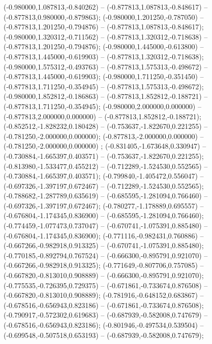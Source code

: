  (-0.980000,1.087813,-0.840262) -- (-0.877813,1.087813,-0.848617) -- (-0.877813,0.980000,-0.879863);
 (-0.980000,1.201250,-0.787050) -- (-0.877813,1.201250,-0.794876) -- (-0.877813,1.087813,-0.848617);
 (-0.980000,1.320312,-0.711562) -- (-0.877813,1.320312,-0.718638) -- (-0.877813,1.201250,-0.794876);
 (-0.980000,1.445000,-0.613800) -- (-0.877813,1.445000,-0.619903) -- (-0.877813,1.320312,-0.718638);
 (-0.980000,1.575312,-0.493763) -- (-0.877813,1.575313,-0.498672) -- (-0.877813,1.445000,-0.619903);
 (-0.980000,1.711250,-0.351450) -- (-0.877813,1.711250,-0.354945) -- (-0.877813,1.575313,-0.498672);
 (-0.980000,1.852812,-0.186863) -- (-0.877813,1.852812,-0.188721) -- (-0.877813,1.711250,-0.354945);
 (-0.980000,2.000000,0.000000) -- (-0.877813,2.000000,0.000000) -- (-0.877813,1.852812,-0.188721);
 (-0.852512,-1.828232,0.180428) -- (-0.753637,-1.822670,0.221255) -- (-0.781250,-2.000000,0.000000);
 (-0.877813,-2.000000,0.000000) -- (-0.781250,-2.000000,0.000000) ;
 (-0.831405,-1.673648,0.330947) -- (-0.730884,-1.665397,0.403571) -- (-0.753637,-1.822670,0.221255);
 (-0.813980,-1.533477,0.455212) -- (-0.712289,-1.524530,0.552565) -- (-0.730884,-1.665397,0.403571);
 (-0.799840,-1.405472,0.556047) -- (-0.697326,-1.397197,0.672467) -- (-0.712289,-1.524530,0.552565);
 (-0.788682,-1.287789,0.635619) -- (-0.685595,-1.281094,0.766460) -- (-0.697326,-1.397197,0.672467);
 (-0.780277,-1.178889,0.695557) -- (-0.676804,-1.174345,0.836900) -- (-0.685595,-1.281094,0.766460);
 (-0.774459,-1.077473,0.737047) -- (-0.670741,-1.075391,0.885480) -- (-0.676804,-1.174345,0.836900);
 (-0.771116,-0.982431,0.760886) -- (-0.667266,-0.982918,0.913325) -- (-0.670741,-1.075391,0.885480);
 (-0.770185,-0.892794,0.767524) -- (-0.666300,-0.895791,0.921070) -- (-0.667266,-0.982918,0.913325);
 (-0.771649,-0.807706,0.757085) -- (-0.667820,-0.813010,0.908889) -- (-0.666300,-0.895791,0.921070);
 (-0.775535,-0.726395,0.729375) -- (-0.671861,-0.733674,0.876508) -- (-0.667820,-0.813010,0.908889);
 (-0.781916,-0.648152,0.683867) -- (-0.678516,-0.656943,0.823186) -- (-0.671861,-0.733674,0.876508);
 (-0.790917,-0.572302,0.619683) -- (-0.687939,-0.582008,0.747679) -- (-0.678516,-0.656943,0.823186);
 (-0.801946,-0.497534,0.539504) -- (-0.699548,-0.507518,0.653193) -- (-0.687939,-0.582008,0.747679);
